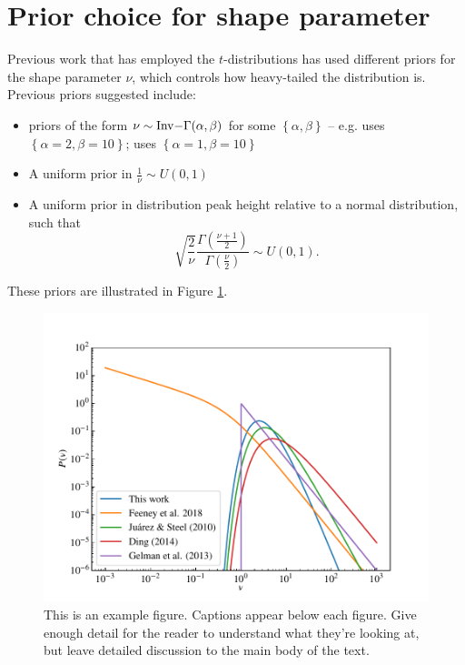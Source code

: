 \documentclass[fleqn,usenatbib]{mnras}
\begin{document}


\appendix

\section{Prior choice for shape parameter}

Previous work that has employed the $t$-distributions has used different
priors for the shape parameter $\nu$, which controls how heavy-tailed the
distribution is. Previous priors suggested include:
\begin{itemize}
    \item priors of the form $\nu \sim {\rm Inv-}\Gamma(\alpha, \beta)$ for some
          $\left\{\alpha, \beta\right\}$ -- e.g.
          \citet{Juarez:2010} uses $\left\{\alpha = 2, \beta = 10\right\}$;
          \citet{Ding:2014} uses $\left\{\alpha = 1, \beta = 10\right\}$
    \item A uniform prior in $\frac1\nu \sim U(0, 1)$ \citep{Gelman:2013}
    \item A uniform prior in distribution peak height relative to a normal
    distribution, such that
    \begin{equation}
        \sqrt{\frac2\nu}\frac{\Gamma\left(\frac{\nu + 1}{2}\right)}{\Gamma\left(\frac{\nu}{2}\right)} \sim U(0, 1).
    \end{equation}
\end{itemize}
These priors are illustrated in Figure \ref{fig:priors.pdf}.

\begin{figure}
	\includegraphics[width=\columnwidth]{graphics/pdf_nu}
    \caption{This is an example figure. Captions appear below each figure.
	Give enough detail for the reader to understand what they're looking at,
	but leave detailed discussion to the main body of the text.}
    \label{fig:priors.pdf}
\end{figure}
\end{document}
